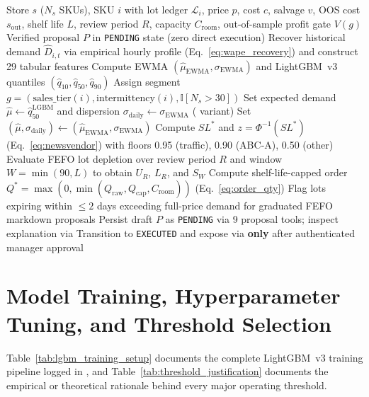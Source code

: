 \begin{algorithm}[htbp]
\caption{Profit-Gated Perishable Newsvendor (\texttt{B-Gate}), FEFO Caps \& HITL (\texttt{ops\_chest})}
\label{alg:ops_chest_newsvendor}
\footnotesize
\begin{algorithmic}[1]
\Require Store $s$ ($N_s$ SKUs), SKU $i$ with lot ledger $\mathcal{L}_i$, price $p$, cost $c$, salvage $v$, OOS cost $s_{\text{out}}$, shelf life $L$, review period $R$, capacity $C_{\text{room}}$, out-of-sample profit gate $V(g)$
\Ensure Verified proposal $P$ in \texttt{PENDING} state (zero direct execution)
\State Recover historical demand $\hat{D}_{i,t}$ via empirical hourly profile (Eq.~\ref{eq:wape_recovery}) and construct 29 tabular features
\State Compute EWMA $(\hat{\mu}_{\text{EWMA}}, \sigma_{\text{EWMA}})$ and LightGBM~v3 quantiles $(\hat{q}_{10}, \hat{q}_{50}, \hat{q}_{90})$
\State Assign segment $g = (\text{sales\_tier}(i), \text{intermittency}(i), \mathbb{I}[N_s > 30])$
    \State Set expected demand $\hat{\mu} \gets \hat{q}_{50}^{\text{LGBM}}$ and dispersion $\sigma_{\text{daily}} \gets \sigma_{\text{EWMA}}$ ( variant)
\Else
    \State Set $(\hat{\mu}, \sigma_{\text{daily}}) \gets (\hat{\mu}_{\text{EWMA}}, \sigma_{\text{EWMA}})$
\EndIf
\State Compute $SL^*$ and $z = \Phi^{-1}(SL^*)$ (Eq.~\ref{eq:newsvendor}) with floors 0.95 (traffic), 0.90 (ABC-A), 0.50 (other)
\State Evaluate FEFO lot depletion over review period $R$ and window $W = \min(90, L)$ to obtain $U_R$, $L_R$, and $S_W$
\State Compute shelf-life-capped order $Q^* = \max(0, \min(Q_{\text{raw}}, Q_{\text{cap}}, C_{\text{room}}))$ (Eq.~\ref{eq:order_qty})
\State Flag lots expiring within $\le 2$ days exceeding full-price demand for graduated FEFO markdown proposals
\State Persist draft $P$ as \texttt{PENDING} via 9 proposal tools; inspect explanation via 
\State Transition to \texttt{EXECUTED} and expose via  \textbf{only} after authenticated manager approval
\end{algorithmic}
\end{algorithm}

\section{Model Training, Hyperparameter Tuning, and Threshold Selection}

Table~\ref{tab:lgbm_training_setup} documents the complete LightGBM~v3 training pipeline logged in , and Table~\ref{tab:threshold_justification} documents the empirical or theoretical rationale behind every major operating threshold.

